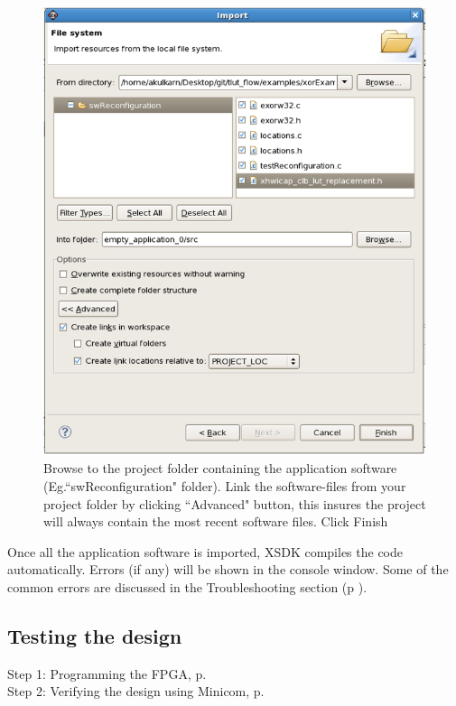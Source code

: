 \documentclass[a4paper,oneside]{memoir}
\begin{document}
\begin{itemize}
\begin{figure}[H]
\includegraphics[scale=0.5]{softwarestep7}
\caption{Browse to the project folder containing the application software (Eg.``swReconfiguration" folder). Link the software-files from your project folder by clicking ``Advanced" button, this insures the project will always contain the most recent software files. Click Finish \label{fig:softwarestep7}}
\end{figure}

Once all the application software is imported, XSDK compiles the code automatically. Errors (if any) will be shown in the console window. Some of the common errors are discussed in the Troubleshooting section (p \pageref{sec:xilinx_troubleshooting}).

\subsection{Testing the design}\label{sec:testing_blaze}
Step 1: Programming the FPGA, p.\ \pageref{sec:program_FPGA_blaze}\\
Step 2: Verifying the design using Minicom, p.\ \pageref{sec:verifying_minicom_blaze}\\
\\


\end{itemize}
\end{document}
